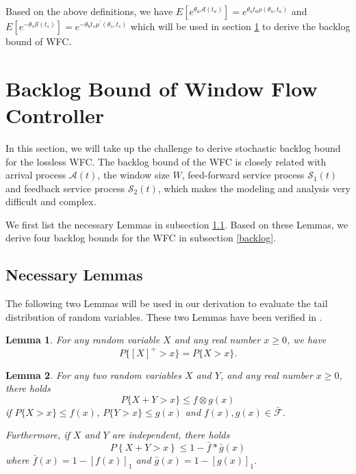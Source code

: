 \documentclass[12pt]{article}
\newtheorem{lemma}{Lemma}
\begin{document}
Based on the above definitions, we have $E[e^{\theta_a \mathcal{A}(t_a)}]=e^{\theta_a t_a\rho(\theta_a,t_a)}$ and
$E[e^{-\theta_s \mathcal{S}(t_s)}]=e^{-\theta_b t_s\mu^\prime(\theta_s,t_s)}$ which will be used in section \ref{sncloss} to derive the backlog bound of WFC.

\section{Backlog Bound of Window Flow Controller}\label{sncloss}
In this section, we will take up the challenge to derive stochastic backlog bound for the lossless WFC. The backlog bound of the WFC is closely related with arrival process $\mathcal{A}(t)$, the window size $W$, feed-forward service process $\mathcal{S}_1(t)$ and feedback service process $\mathcal{S}_2(t)$, which makes the modeling and analysis very difficult and complex.

We first list the necessary Lemmas in subsection \ref{neclemma}. Based on these Lemmas, we derive four backlog bounds for the WFC in subsection \ref{backlog}.
\subsection{Necessary Lemmas}\label{neclemma}
The following two Lemmas will be used in our derivation to evaluate the tail distribution of random variables. These two Lemmas have been verified in \cite{jiang2006basic}.
\begin{lemma}\label{lamma1}
For any random variable $X$ and any real number $x\geq 0$, we have $$P\{[X]^+>x\}=P\{X>x\}.$$
\end{lemma}

\begin{lemma}\label{lamma3}
For any two random variables $X$ and $Y$, and any real number $x\geq 0$, there holds
$$P\{X+Y>x\}\leq f\otimes g(x)$$
if $P\{X>x\}\leq f(x)$, $P\{Y>x\}\leq g(x)$ and $f(x),g(x)\in\bar{\mathcal{F}}$.

Furthermore, if $X$ and $Y$ are independent, there holds
$$P\left\{X+Y>x\right\}\leq 1-\bar{f}\ast\bar{g}(x)$$
where $\bar{f}(x)=1-[f(x)]_1$ and $\bar{g}(x)=1-[g(x)]_1$.
\end{lemma}
\end{document}
